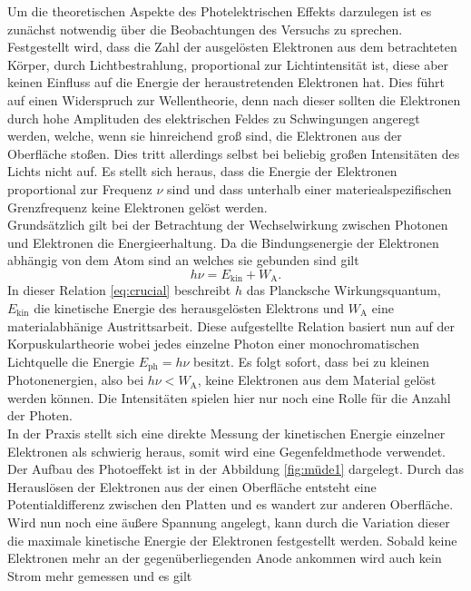 Um die theoretischen Aspekte des Photelektrischen Effekts darzulegen ist es zunächst notwendig über die Beobachtungen des Versuchs zu sprechen.
Festgestellt wird, dass die Zahl der ausgelösten Elektronen aus dem betrachteten Körper, durch Lichtbestrahlung, proportional zur Lichtintensität ist, diese aber keinen Einfluss auf die Energie der heraustretenden Elektronen hat. Dies 
führt auf einen Widerspruch zur Wellentheorie, denn nach dieser sollten die Elektronen durch hohe Amplituden des elektrischen Feldes zu Schwingungen angeregt werden, welche, wenn sie hinreichend groß sind, die Elektronen aus der Oberfläche stoßen.
Dies tritt allerdings selbst bei beliebig großen Intensitäten des Lichts nicht auf. Es stellt sich heraus, dass die Energie der Elektronen proportional zur Frequenz $\nu$ sind und dass unterhalb einer materiealspezifischen Grenzfrequenz keine Elektronen gelöst werden.
\\
Grundsätzlich gilt bei der Betrachtung der Wechselwirkung zwischen Photonen und Elektronen die Energieerhaltung. Da die Bindungsenergie der Elektronen abhängig von dem Atom sind an welches sie gebunden sind gilt 
\begin{equation}
    \label{eq:crucial}
h \nu = E_{\text{kin}} + W_{\text{A}}.
\end{equation}
In dieser Relation \eqref{eq:crucial} beschreibt $h$ das Plancksche Wirkungsquantum, $E_{\text{kin}}$ die kinetische Energie des herausgelösten Elektrons und $W_{\text{A}}$ eine materialabhänige Austrittsarbeit.
Diese aufgestellte Relation basiert nun auf der Korpuskulartheorie wobei jedes einzelne Photon einer monochromatischen Lichtquelle die Energie $E_{\text{ph}} = h\nu$ besitzt. Es folgt sofort, dass bei zu kleinen Photonenergien, also bei
$h \nu < W_{\text{A}}$, keine Elektronen aus dem Material gelöst werden können. Die Intensitäten spielen hier nur noch eine Rolle für die Anzahl der Photen.
\\
In der Praxis stellt sich eine direkte Messung der kinetischen Energie einzelner Elektronen als schwierig heraus, somit wird eine Gegenfeldmethode verwendet. Der Aufbau des
Photoeffekt ist in der Abbildung \ref{fig:müde1} dargelegt. Durch das Herauslösen der Elektronen aus der einen Oberfläche entsteht eine Potentialdifferenz zwischen den Platten und es wandert zur anderen Oberfläche. Wird nun noch eine äußere Spannung angelegt, kann durch 
die Variation dieser die maximale kinetische Energie der Elektronen festgestellt werden. Sobald keine Elektronen mehr an der gegenüberliegenden Anode ankommen wird auch kein Strom mehr gemessen und es gilt
